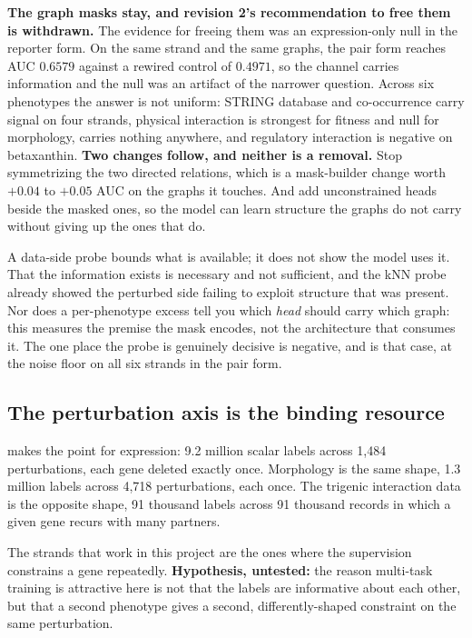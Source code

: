 \begin{keybox}
\textbf{The graph masks stay, and revision 2's recommendation to free them is withdrawn.}
The evidence for freeing them was an expression-only null in the reporter form. On the same
strand and the same graphs, the pair form reaches AUC $0.6579$ against a rewired control of
$0.4971$, so the channel carries information and the null was an artifact of the narrower
question. Across six phenotypes the answer is not uniform: STRING database and co-occurrence
carry signal on four strands, physical interaction is strongest for fitness and null for
morphology,  carries nothing anywhere, and regulatory interaction is negative on
betaxanthin. \textbf{Two changes follow, and neither is a removal.} Stop symmetrizing the two
directed relations, which is a mask-builder change worth $+0.04$ to $+0.05$ AUC on the graphs
it touches. And add unconstrained heads beside the masked ones, so the model can learn
structure the graphs do not carry without giving up the ones that do.
\end{keybox}

 A data-side probe bounds what is available; it does
not show the model uses it. That the information exists is necessary and not sufficient, and
the kNN probe already showed the perturbed side failing to exploit structure that was
present. Nor does a per-phenotype excess tell you which \emph{head} should carry which graph:
this measures the premise the mask encodes, not the architecture that consumes it. The one
place the probe is genuinely decisive is negative, and  is that case, at the
noise floor on all six strands in the pair form.

\subsection{The perturbation axis is the binding resource}

 makes the point for expression: 9.2 million scalar labels
across 1,484 perturbations, each gene deleted exactly once. Morphology is the same shape,
1.3 million labels across 4,718 perturbations, each once. The trigenic interaction data is
the opposite shape, 91 thousand labels across 91 thousand records in which a given gene
recurs with many partners.

The strands that work in this project are the ones where the supervision constrains a gene
repeatedly. \textbf{Hypothesis, untested:} the reason multi-task training is attractive here
is not that the labels are informative about each other, but that a second phenotype gives
a second, differently-shaped constraint on the same perturbation.

